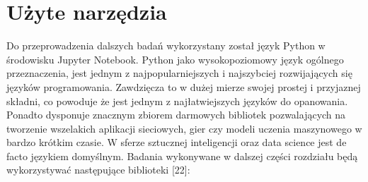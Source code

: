 \documentclass[a4paper,12pt,oneside]{book}
\begin{document}
\section{Użyte narzędzia}
Do przeprowadzenia dalszych badań wykorzystany został język Python w środowisku Jupyter Notebook. Python jako wysokopoziomowy język ogólnego przeznaczenia, jest jednym z najpopularniejszych i najszybciej rozwijających się języków programowania. Zawdzięcza to w dużej mierze swojej prostej i przyjaznej składni, co powoduje że jest  jednym z najłatwiejszych języków do opanowania. Ponadto dysponuje znacznym zbiorem darmowych bibliotek pozwalających na tworzenie wszelakich aplikacji sieciowych, gier czy modeli uczenia maszynowego w bardzo krótkim czasie. W sferze sztucznej inteligencji oraz data science jest de facto językiem domyślnym. Badania wykonywane w dalszej części rozdziału będą wykorzystywać następujące biblioteki [22]:
\end{document}
